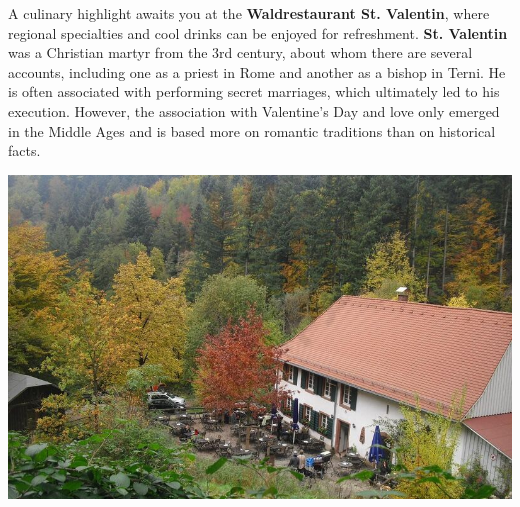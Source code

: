 \documentclass[landscape, a4paper]{article}
\newcommand\alert[1]{\textcolor{PrimaryColor}{\textbf{#1}}}
\begin{document}
\begin{minipage}[t]{0.31\textwidth}
\end{minipage}%
\hfill\color{white}%
\vrule width 0.01cm
\hfill\color{black}%
\begin{minipage}[t]{0.31\textwidth}
	\vspace{0cm}
	\setlength{\parskip}{0.25cm}

  A culinary highlight awaits you at the \alert{Waldrestaurant St. Valentin}, where regional specialties and cool drinks can be enjoyed for refreshment. \alert{St. Valentin} was a Christian martyr from the 3rd century, about whom there are several accounts, including one as a priest in Rome and another as a bishop in Terni. He is often associated with performing secret marriages, which ultimately led to his execution. However, the association with Valentine's Day and love only emerged in the Middle Ages and is based more on romantic traditions than on historical facts.

	\includegraphics[width=\linewidth]{./figures/stvalentin_2.png}
	\setlength{\parskip}{0.25cm}


\end{minipage}
\end{document}
